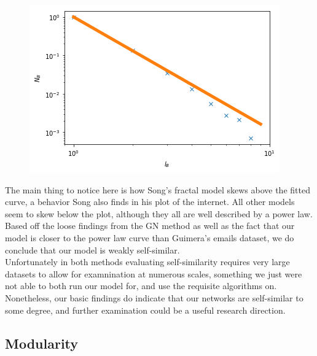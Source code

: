 \documentclass[12pt,twoside]{report}
\begin{document}
\begin{figure}[H]
\begin{center}
\begin{minipage}{0.45\linewidth}
\end{minipage}%
\hfill
\begin{minipage}{0.45\linewidth}
\includegraphics[width=\linewidth]{figures/1500_hausdorff.png}
\end{minipage}
\end{center}
\end{figure}

The main thing to notice here is how Song's fractal model skews above the fitted curve, a behavior Song also finds in his plot of the internet. All other models seem to skew below the plot, although they all are well described by a power law. Based off the loose findings from the GN method as well as the fact that our model is closer to the power law curve than Guimera's emails dataset, we do conclude that our model is weakly self-similar. \\

Unfortunately in both methods evaluating self-similarity requires very large datasets to allow for examnination at numerous scales, something we just were not able to both run our model for, and use the requisite algorithms on. Nonetheless, our basic findings do indicate that our networks are self-similar to some degree, and further examination could be a useful research direction. \\


\subsection{Modularity}
\end{document}
